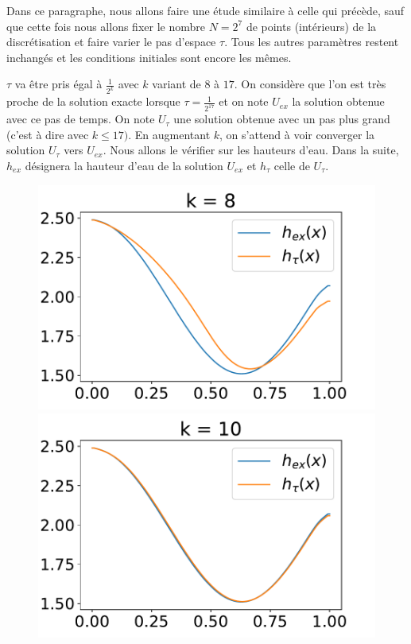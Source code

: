 \documentclass[
11pt, %
francais, %
singlespacing, %
headsepline, %
f%
]{MastersDoctoralThesis} %
\theoremstyle{definition}
\begin{document}
Dans ce paragraphe, nous allons faire une étude similaire à celle qui précède, sauf que cette fois nous allons fixer le nombre $N=2^{7}$ de points (intérieurs) de la discrétisation et faire varier le pas d'espace $\tau$.
Tous les autres paramètres restent inchangés et les conditions initiales sont encore les mêmes.

$\tau$ va être pris égal à $\frac{1}{2^{k}}$ avec $k$ variant de $8$ à $17$. On considère que l'on est très proche de la solution exacte lorsque $\tau = \frac{1}{2^{17}}$ et on note $U_{ex}$ la solution obtenue avec ce pas de temps.
On note $U_{\tau}$ une solution obtenue avec un pas plus grand (c'est à dire avec $k\leq17)$. En augmentant $k$, on s'attend à voir converger la solution $U_{\tau}$ vers $U_{ex}$. Nous allons le vérifier sur les hauteurs d'eau. Dans la suite, $h_{ex}$ désignera la hauteur d'eau de la solution $U_{ex}$ et $h_{\tau}$ celle de $U_{\tau}$.

\begin{figure}
\includegraphics[scale = .6]{testconvtau8}
\includegraphics[scale = .6]{testconvtau10} 
\end{figure}
\end{document}
